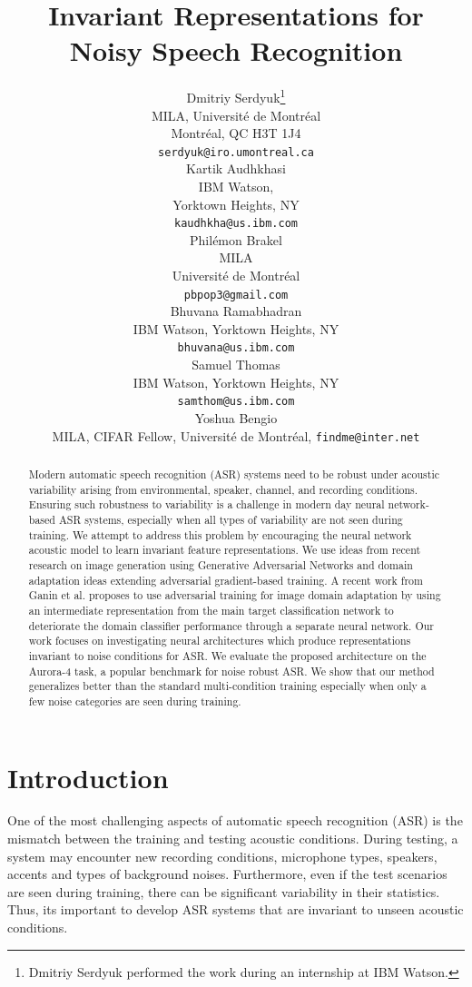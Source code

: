 \documentclass{article}
\title{Invariant Representations for Noisy Speech Recognition}
\author{
  Dmitriy Serdyuk\thanks{Dmitriy Serdyuk performed the work 
    during an internship at IBM Watson.} \\
  MILA,
  Universit\'e de Montr\'eal\\
  Montr\'eal, QC H3T 1J4 \\
  \texttt{serdyuk@iro.umontreal.ca} \\
  \And
  Kartik Audhkhasi \\
  IBM Watson, \\
  Yorktown Heights, NY \\
  \texttt{kaudhkha@us.ibm.com} \\
  \And
  Phil\'emon Brakel \\
  MILA\\
  Universit\'e de Montr\'eal\\
  \texttt{pbpop3@gmail.com} \\
  \And
  Bhuvana Ramabhadran\\
  IBM Watson,
  Yorktown Heights, NY \\
  \texttt{bhuvana@us.ibm.com} \\
  \And
  Samuel Thomas\\
  IBM Watson,
  Yorktown Heights, NY \\
  \texttt{samthom@us.ibm.com} \\
  \And
  Yoshua Bengio\\
  MILA, CIFAR Fellow,
  Universit\'e de Montr\'eal,
  \texttt{findme@inter.net} \\
}
\begin{document}
%
\maketitle
%
\begin{abstract}
    Modern automatic speech recognition (ASR) systems need to be robust under acoustic variability arising from environmental, speaker, channel, and recording conditions. Ensuring such robustness to variability is a challenge in modern day neural network-based ASR systems, especially when all types of variability are not seen during training. We attempt to address this problem by encouraging the neural network acoustic model to learn invariant feature representations.
    We use ideas from recent research on image generation using
    Generative Adversarial Networks and domain adaptation ideas extending
    adversarial gradient-based training. A recent work from Ganin et al. proposes to
    use adversarial training for image domain adaptation by using an intermediate
    representation from the main target classification network to deteriorate the domain 
    classifier performance through a separate neural network.
    Our work focuses on investigating neural architectures which produce
    representations invariant to noise conditions for ASR.  We evaluate the proposed architecture on the Aurora-4 task, a popular benchmark for
    noise robust ASR. We show that our method generalizes better than the standard multi-condition training especially when only a few noise categories are seen during training.
\end{abstract}
%
%
\section{Introduction}
\label{sec:intro}
    One of the most challenging aspects of automatic speech recognition (ASR)
    is the mismatch between the training and testing acoustic conditions. During
    testing, a system may encounter new recording conditions, microphone types, speakers,
    accents and types of background noises. Furthermore, even if the test scenarios are seen during training, there can be significant variability in their statistics. Thus, its important to develop ASR systems that are invariant to unseen acoustic conditions.
\end{document}
